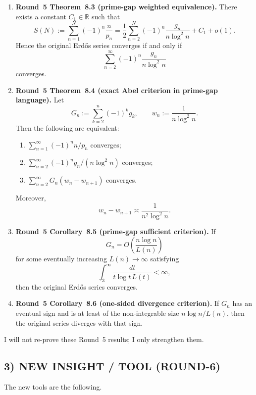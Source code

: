 \begin{enumerate}
\item \textbf{Round~5 Theorem~8.3 (prime-gap weighted equivalence).}
There exists a constant \(C_1\in\mathbb R\) such that
\[
S(N):=\sum_{n=1}^N (-1)^n\frac{n}{p_n}
=
\frac12 \sum_{n=2}^N (-1)^n \frac{g_n}{n\log^2 n}
+ C_1 + o(1).
\]
Hence the original Erd\H{o}s series converges if and only if
\[
\sum_{n=2}^\infty (-1)^n \frac{g_n}{n\log^2 n}
\]
converges.

\item \textbf{Round~5 Theorem~8.4 (exact Abel criterion in prime-gap language).}
Let
\[
G_n:=\sum_{k=2}^n (-1)^k g_k,
\qquad
w_n:=\frac{1}{n\log^2 n}.
\]
Then the following are equivalent:
\begin{enumerate}
\item[(i)] \(\sum_{n=1}^\infty (-1)^n n/p_n\) converges;
\item[(ii)] \(\sum_{n=2}^\infty (-1)^n g_n/(n\log^2 n)\) converges;
\item[(iii)] \(\sum_{n=2}^\infty G_n(w_n-w_{n+1})\) converges.
\end{enumerate}
Moreover,
\[
w_n-w_{n+1}\asymp \frac{1}{n^2\log^2 n}.
\]

\item \textbf{Round~5 Corollary~8.5 (prime-gap sufficient criterion).}
If
\[
G_n=O\!\left(\frac{n\log n}{L(n)}\right)
\]
for some eventually increasing \(L(n)\to\infty\) satisfying
\[
\int_3^\infty \frac{dt}{t\log t\,L(t)}<\infty,
\]
then the original Erd\H{o}s series converges.

\item \textbf{Round~5 Corollary~8.6 (one-sided divergence criterion).}
If \(G_n\) has an eventual sign and is at least of the non-integrable size \(n\log n/L(n)\), then the original series diverges with that sign.
\end{enumerate}

I will not re-prove these Round~5 results; I only strengthen them.

\subsection*{3) NEW INSIGHT / TOOL (ROUND-6)}

The new tools are the following.


